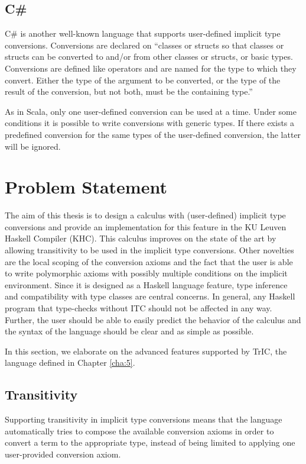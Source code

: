 \subsection{C\#}
C\# \cite{csharp} is another well-known language that supports user-defined implicit type conversions. Conversions are declared on ``classes or structs so that classes or structs can be converted to and/or from other classes or structs, or basic types. Conversions are defined like operators and are named for the type to which they convert. Either the type of the argument to be converted, or the type of the result of the conversion, but not both, must be the containing type.''

As in Scala, only one user-defined conversion can be used at a time. Under some conditions it is possible to write conversions with generic types. If there exists a predefined conversion for the same types of the user-defined conversion, the latter will be ignored.
\section{Problem Statement}
\label{problem}
The aim of this thesis is to design a calculus with (user-defined) implicit type conversions and provide an implementation for this feature in the KU Leuven Haskell Compiler (KHC). This calculus improves on the state of the art by allowing transitivity to be used in the implicit type conversions. Other novelties are the local scoping of the conversion axioms and the fact that the user is able to write polymorphic axioms with possibly multiple conditions on the implicit environment. 
Since it is designed as a Haskell language feature, type inference and compatibility with type classes are central concerns. In general, any Haskell program that type-checks without ITC should not be affected in any way. Further, the user should be able to easily predict the behavior of the calculus and the syntax of the language should be clear and as simple as possible.

In this section, we elaborate on the advanced features supported by TrIC, the language defined in Chapter \ref{cha:5}.

\subsection{Transitivity}
Supporting transitivity in implicit type conversions means that the language automatically tries to compose the available conversion axioms in order to convert a term to the appropriate type, instead of being limited to applying one user-provided conversion axiom.

